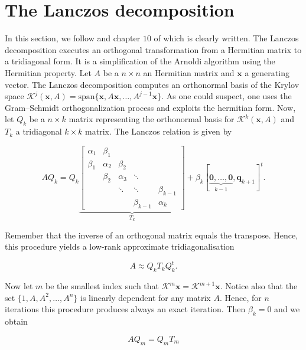 \documentclass[12pt,a4paper,oneside]{book}
\begin{document}
{\section{The Lanczos decomposition}\label{appendix_lanczos_dec}


In this section, we follow \cite{gardner2018gpytorch} and chapter $10$ of \cite{arbenz2012lecture} which is clearly written. The Lanczos decomposition executes an orthogonal transformation from a Hermitian matrix to a tridiagonal form. It is a simplification of the Arnoldi algorithm using the Hermitian property.  Let $A$ be a $n \times n$ an Hermitian matrix and $\bm{x}$ a generating vector. The Lanczos decomposition computes an orthonormal basis of the Krylov space $\mathcal{K}^j(\bm{x}, A) = \text{span} \{ \bm{x},A \bm{x}, \ldots, A^{j-1} \bm{x} \}$. As one could suspect, one uses the Gram–Schmidt orthogonalization process and exploits the hermitian form. Now, let $Q_k$ be a $n \times k$ matrix representing the orthonormal basis for $\mathcal{K}^{k}(\bm{x}, A)$ and $T_k$ a tridiagonal $k \times k$ matrix. The Lanczos relation is given by

\begin{equation}
A Q_k = Q_k 
	\underbrace{\begin{bmatrix}
    \alpha_1 & \beta_1& & & \\
    \beta_1  &\alpha_2 & \beta_2 & &\\
     & \beta_2 & \alpha_3 & \ddots &  \\
     & & \ddots   &\ddots & \beta_{k-1} \\
     & & & \beta_{k-1} & \alpha_k 
	\end{bmatrix}}_{T_k}  + \beta_k [\underbrace{\bm{0}, \ldots, \bm{0}}_{k-1}, \bm{q}_{k+1}]^t.
\end{equation}

Remember that the inverse of an orthogonal matrix equals the transpose. Hence, this procedure yields a low-rank approximate tridiagonalisation 

\begin{equation}
A \approx Q_k T_k Q_k^t.
\end{equation}

Now let $m$ be the smallest index such that $\mathcal{K}^{m}{\bm{x}} = \mathcal{K}^{m+1}{\bm{x}}$. Notice also that the set $\{1, A, A^2, \ldots , A^n \}$ is linearly dependent for any matrix $A$. Hence, for $n$ iterations this procedure produces always an exact iteration. Then $\beta_k =0$ and we obtain 

\begin{equation}
A Q_m = Q_m T_m
\end{equation}

}
\end{document}
